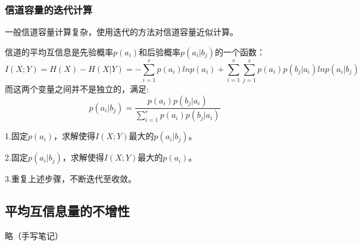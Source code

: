 \documentclass[UTF8]{ctexart} %
\begin{document}
		\subsubsection{信道容量的迭代计算}	
			一般信道容量计算复杂，使用迭代的方法对信道容量近似计算。
				
			信道的平均互信息是先验概率$p(a_i)$和后验概率$p(a_i|b_j)$的一个函数：
			\[I(X;Y) = H(X)-H(X|Y) = -\sum_{i=1}^rp(a_i)lnp(a_i)+\sum_{i=1}^r\sum_{j=1}^sp(a_i)p(b_j|a_i)lnp(a_i|b_j)\]
			而这两个变量之间并不是独立的，满足:
			\[p(a_i|b_j) = \frac{p(a_i)p(b_j|a_i)}{\sum_{i=1}^rp(a_i)p(b_j|a_i)}\]
			
			1.固定$p(a_i)$，求解使得$I(X;Y)$最大的$p(a_i|b_j)$。
			
			2.固定$p(a_i|b_j)$，求解使得$I(X;Y)$最大的$p(a_i)$。
			
			3.重复上述步骤，不断迭代至收敛。
	\subsection{平均互信息量的不增性}
		略（手写笔记）
		
		
				
		
		
		
		
		
\end{document}
